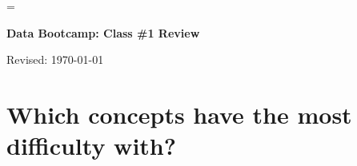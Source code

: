 \documentclass[11pt]{article}
\begin{document}
\parskip=\bigskipamount
\parindent=0.0in
\thispagestyle{empty}


\bigskip\bigskip
\centerline{\Large \bf Data Bootcamp:  Class \#1 Review}
\centerline{Revised: \today}


\section*{Which concepts have the most difficulty with?} 
\end{document}
